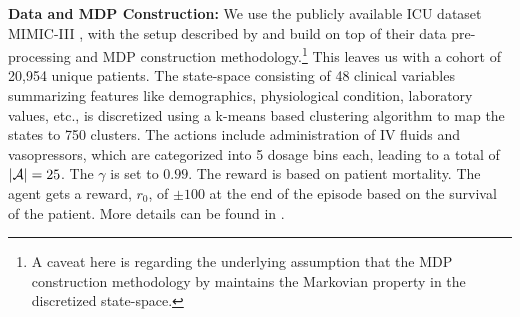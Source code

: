 




\textbf{Data and MDP Construction:} 
We use the publicly available ICU dataset MIMIC-III  \citep{johnson2016mimic}, with the setup described by \citet{komorowski2018artificial, tang2020clinician} and build on top of their data pre-processing and MDP construction methodology.\footnote{A caveat here is regarding the underlying assumption that the MDP construction methodology by \citet{komorowski2018artificial, tang2020clinician} maintains the Markovian property in the discretized state-space.} 
This leaves us with a cohort of 20,954 unique patients. 
The state-space consisting of 48 clinical variables summarizing features like demographics, physiological condition, laboratory values, etc., is discretized using a k-means based clustering algorithm to map the states to 750 clusters.
The actions include administration of IV fluids and vasopressors, which are categorized into 5 dosage bins each, leading to a total of $|\mathcal{A}|=25$. The $\gamma$ is set to $0.99$. The reward is based on patient mortality. The agent gets a reward, $r_0$, of $\pm 100$ at the end of the episode based on the survival of the patient. More details can be found in .


